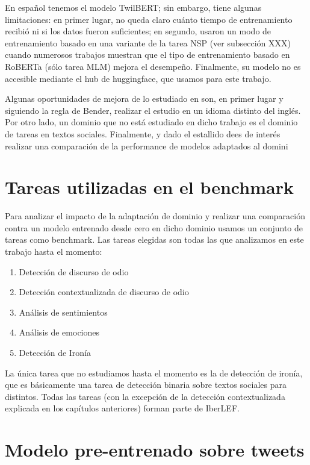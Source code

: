 En español tenemos el modelo TwilBERT\cite{gonzalez2021twilbert}; sin embargo, tiene algunas limitaciones: en primer lugar, no queda claro cuánto tiempo de entrenamiento recibió ni si los datos fueron suficientes; en segundo, usaron un modo de entrenamiento basado en una variante de la tarea NSP (ver subsección XXX) cuando numerosos trabajos muestran que el tipo de entrenamiento basado en RoBERTa (sólo tarea MLM) mejora el desempeño. Finalmente, su modelo no es accesible mediante el hub de huggingface, que usamos para este trabajo.


Algunas oportunidades de mejora de lo estudiado en \citet{gururangan-etal-2020-dont} son, en primer lugar y siguiendo la regla de Bender\cite{bender2011achieving}, realizar el estudio en un idioma distinto del inglés. Por otro lado, un dominio que no está estudiado en dicho trabajo es el dominio de tareas en textos sociales. Finalmente, y dado el estallido dees de interés realizar una comparación de la performance de modelos adaptados al domini

\section{Tareas utilizadas en el benchmark}

Para analizar el impacto de la adaptación de dominio y realizar una comparación contra un modelo entrenado desde cero en dicho dominio usamos un conjunto de tareas como benchmark. Las tareas elegidas son todas las que analizamos en este trabajo hasta el momento:

\begin{enumerate}
    \item Detección de discurso de odio
    \item Detección contextualizada de discurso de odio
    \item Análisis de sentimientos
    \item Análisis de emociones
    \item Detección de Ironía
\end{enumerate}

La única tarea que no estudiamos hasta el momento es la de detección de ironía, que es básicamente una tarea de detección binaria sobre textos sociales para distintos. Todas las tareas (con la excepción de la detección contextualizada explicada en los capítulos anteriores) forman parte de IberLEF.




\section{Modelo pre-entrenado sobre tweets}
\label{sec:robertuito_pretrained_model}

